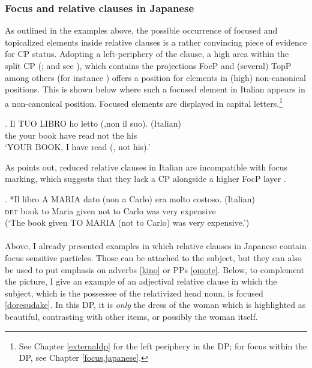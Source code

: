 \documentclass [output=book,colorlinks,citecolor=brown]{langscibook}
\begin{document}
\subsubsection{Focus and relative clauses in Japanese} \label{focusincp}

As outlined in the examples above, the possible occurrence of focused and topicalized elements inside relative clauses is a rather convincing piece of evidence for CP status. Adopting a left-periphery of the clause, a high area within the split CP (\citealt{rizzi:1997:the}; and see \citealt{grohmann:2003:prolific, laenzlinger:2011:elements}), which contains the projections FocP and (several) TopP among others (for instance \citealt{kiss:1998:identificational, kiss:2007:topic, aboh:2014:info}) offers a position for elements in (high) non-canonical positions. This is shown below where such a focused element in Italian appears in a non-canonical position. Focused elements are displayed in capital letters.\footnote{See Chapter \ref{externaldp} for the left periphery in the DP; for focus within the DP, see Chapter \ref{focus,japanese}.}  %

\exg. Il TUO LIBRO ho letto (,non il suo). (Italian) \\
the your book have read not the his\\
`YOUR BOOK, I have read (, not his).’ \null \hfill \citep[286]{rizzi:1997:the}

As \citet{cinque:2020:relcl} points out, reduced relative clauses in Italian are incompatible with focus marking, which suggests that they lack a CP alongside a higher FocP layer \citep[218–219]{cinque:2020:relcl}. %

\exg. *Il libro A MARIA dato (non a Carlo) era molto costoso. (Italian)\\
\textsc{det} book to Maria given not to Carlo was very expensive\\
(`The book given TO MARIA (not to Carlo) was very expensive.’) \\ \null \hfill \citep[219]{cinque:2020:relcl}\\

Above, I already presented examples in which relative clauses in Japanese contain focus sensitive particles. Those can be attached to the subject, but they can also be used to put emphasis on adverbs \ref{kino} or PPs \ref{omote}. Below, to complement the picture, I give an example of an adjectival relative clause in which the subject, which is the possessee of the relativized head noun, is focused \ref{doresudake}. In this DP, it is \textit{only} the dress of the woman which is highlighted as beautiful, contrasting with other items, or possibly the woman itself. %
\end{document}
